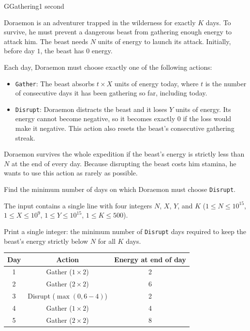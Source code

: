 \begin{problem}{G}{Gathering}{1 second}

\noindent
Doraemon is an adventurer trapped in the wilderness for exactly $K$ days. To survive, he must prevent a dangerous beast from gathering enough energy to attack him. The beast needs $N$ units of energy to launch its attack. Initially, before day $1$, the beast has $0$ energy.

Each day, Doraemon must choose exactly one of the following actions:
\begin{itemize}
  \item \texttt{Gather}: The beast absorbs $t \times X$ units of energy today, where $t$ is the number of consecutive days it has been gathering so far, including today.
  \item \texttt{Disrupt}: Doraemon distracts the beast and it loses $Y$ units of energy. Its energy cannot become negative, so it becomes exactly $0$ if the loss would make it negative. This action also resets the beast's consecutive gathering streak.
\end{itemize}

Doraemon survives the whole expedition if the beast's energy is strictly less than $N$ at the end of every day. Because disrupting the beast costs him stamina, he wants to use this action as rarely as possible.

Find the minimum number of days on which Doraemon must choose \texttt{Disrupt}.

\InputFile

\noindent
The input contains a single line with four integers $N$, $X$, $Y$, and $K$ ($1 \le N \le 10^{15}$, $1 \le X \le 10^9$, $1 \le Y \le 10^{15}$, $1 \le K \le 500$).

\OutputFile

\noindent
Print a single integer: the minimum number of \texttt{Disrupt} days required to keep the beast's energy strictly below $N$ for all $K$ days.

\Examples

\begin{example}
\end{example}

\begin{center}
\begin{tabular}{|c|c|c|}
\hline
\textbf{Day} & \textbf{Action} & \textbf{Energy at end of day} \\
\hline
1 & Gather ($1\times2$) & 2 \\
2 & Gather ($2\times2$) & 6 \\
3 & Disrupt ($\max(0,6-4)$) & 2 \\
4 & Gather ($1\times2$) & 4 \\
5 & Gather ($2\times2$) & 8 \\
\hline
\end{tabular}
\end{center}


\end{problem}
